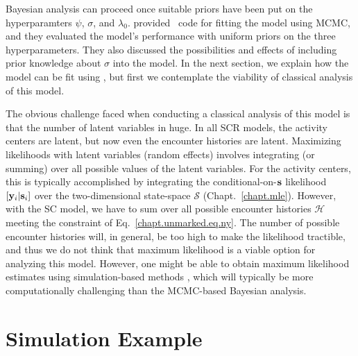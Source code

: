 


Bayesian analysis can proceed once suitable priors have been put on
the hyperparamters $\psi$, $\sigma$, and
$\lambda_0$. \citet{chandler_royle:2012} provided \R~code for fitting
the model using MCMC, and they evaluated the model's performance with
uniform priors on the three hyperparameters. They also discussed the
possibilities and effects of including prior knowledge about $\sigma$
into the model. In the next section, we explain how the model can be
fit using \jags, but first we contemplate the viability of classical
analysis of this model.

The obvious challenge faced when conducting a classical analysis of
this model is that the number of latent variables in huge. In all SCR models, the activity centers are
latent, but now even the encounter histories are latent.
Maximizing likelihoods with latent variables (random effects) involves
integrating (or summing) over all possible values of the latent
variables. For the activity centers, this is typically accomplished by
integrating the conditional-on-$\bf s$ likelihood $[{\bf y}_i|{\bf s}_i]$ over the two-dimensional
state-space $\mathcal{S}$ (Chapt.~\ref{chapt.mle}). However, with
the SC model, we have to sum
over all possible encounter histories $\mathcal{H}$ meeting the
constraint of Eq.~\ref{chapt.unmarked.eq.ny}. The
number of possible encounter histories
will, in general, be too high to make the likelihood tractible,
and thus we do not think that maximum likelihood is a viable option
for analyzing this model. However, one might be able to obtain maximum
likelihood estimates using simulation-based methods
\citep{lele_etal:2010},
which will typically be more computationally
challenging than the MCMC-based Bayesian analysis.


\section{Simulation Example}

